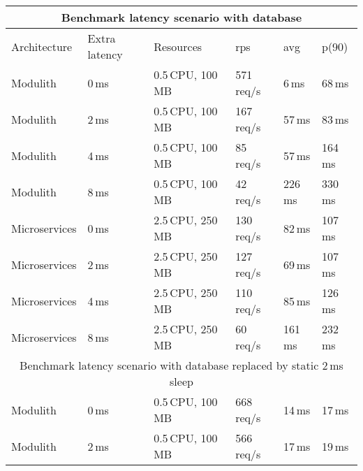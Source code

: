 \begin{table}
    \begin{tabular}{ |p{3cm}||p{1.2cm}|p{3cm}|p{1.5cm}|p{1.5cm}|p{1.5cm}| }
        \hline
        \multicolumn{6}{|c|}{Benchmark latency scenario with database}                                 \\
        \hline
        Architecture  & Extra latency & Resources         & rps        & avg     & p(90)     \\%
        \hline
        \rowcolor{Gray}
        Modulith      & 0\,ms         & 0.5\,CPU, 100\,MB & 571\,req/s & 6\,ms   & 68\,ms    \\ %
        Modulith      & 2\,ms         & 0.5\,CPU, 100\,MB & 167\,req/s & 57\,ms  & 83\,ms    \\ %
        Modulith      & 4\,ms         & 0.5\,CPU, 100\,MB & 85\,req/s  & 57\,ms  & 164\,ms   \\ %
        Modulith      & 8\,ms         & 0.5\,CPU, 100\,MB & 42\,req/s  & 226\,ms & 330\,ms   \\ %
        \rowcolor{Gray}
        Microservices & 0\,ms         & 2.5\,CPU, 250\,MB & 130\,req/s & 82\,ms  & 107\,ms   \\ %
        Microservices & 2\,ms         & 2.5\,CPU, 250\,MB & 127\,req/s & 69\,ms  & 107\,ms   \\ %
        Microservices & 4\,ms         & 2.5\,CPU, 250\,MB & 110\,req/s & 85\,ms  & 126\,ms   \\ %
        Microservices & 8\,ms         & 2.5\,CPU, 250\,MB & 60\,req/s  & 161\,ms & 232\,ms   \\ %
        \hline
        \multicolumn{6}{|c|}{Benchmark latency scenario with database replaced by static 2\,ms sleep } \\
        \hline
        \rowcolor{Gray}
        Modulith      & 0\,ms         & 0.5\,CPU, 100\,MB & 668\,req/s & 14\,ms  & 17\,ms    \\ %
        Modulith      & 2\,ms         & 0.5\,CPU, 100\,MB & 566\,req/s & 17\,ms  & 19\,ms    \\ %

\end{tabular}
\end{table}
